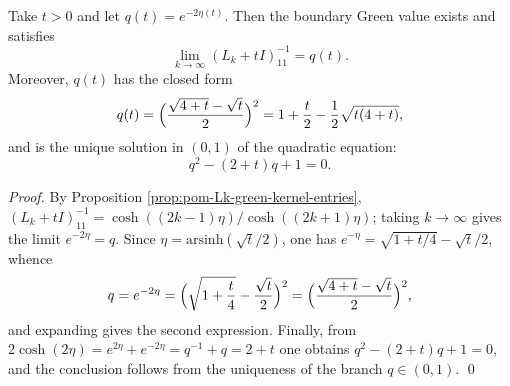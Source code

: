 \begin{corollary}\label{cor:pom-Lk-boundary-fixed-point-riccati}
Take \(t>0\) and let \(q(t)=e^{-2\eta(t)}\).
Then the boundary Green value exists and satisfies
\[
\lim_{k\to\infty}(L_k+tI)^{-1}_{11}=q(t).
\]
Moreover, \(q(t)\) has the closed form
\[
q(t)=\Bigl(\frac{\sqrt{4+t}-\sqrt{t}}{2}\Bigr)^{2}
=1+\frac{t}{2}-\frac{1}{2}\sqrt{t(4+t)},
\]
and is the unique solution in \((0,1)\) of the quadratic equation:
\[
q^2-(2+t)q+1=0.
\]
\end{corollary}
\begin{proof}
By Proposition \ref{prop:pom-Lk-green-kernel-entries}, \((L_k+tI)^{-1}_{11}=\cosh((2k-1)\eta)/\cosh((2k+1)\eta)\); taking \(k\to\infty\) gives the limit \(e^{-2\eta}=q\).
Since \(\eta=\mathrm{arsinh}(\sqrt{t}/2)\), one has \(e^{-\eta}=\sqrt{1+t/4}-\sqrt{t}/2\), whence
\[
q=e^{-2\eta}=\Bigl(\sqrt{1+\frac{t}{4}}-\frac{\sqrt{t}}{2}\Bigr)^2
=\Bigl(\frac{\sqrt{4+t}-\sqrt{t}}{2}\Bigr)^2,
\]
and expanding gives the second expression.
Finally, from \(2\cosh(2\eta)=e^{2\eta}+e^{-2\eta}=q^{-1}+q=2+t\) one obtains \(q^2-(2+t)q+1=0\), and the conclusion follows from the uniqueness of the branch \(q\in(0,1)\). \qed
\end{proof}

